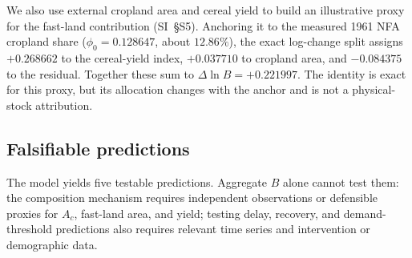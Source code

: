 \documentclass[preprint,12pt,authoryear]{elsarticle}
\begin{document}
We also use external cropland area and cereal yield to build an illustrative proxy for the fast-land contribution (SI~\S S5). Anchoring it to the measured 1961 NFA cropland share ($\phi_0=0.128647$, about $12.86\%$), the exact log-change split assigns $+0.268662$ to the cereal-yield index, $+0.037710$ to cropland area, and $-0.084375$ to the residual. Together these sum to $\Delta\ln B=+0.221997$. The identity is exact for this proxy, but its allocation changes with the anchor and is not a physical-stock attribution.

\subsection{Falsifiable predictions}\label{sec:predictions}

The model yields five testable predictions. Aggregate $B$ alone cannot test them: the composition mechanism requires independent observations or defensible proxies for $A_c$, fast-land area, and yield; testing delay, recovery, and demand-threshold predictions also requires relevant time series and intervention or demographic data.
\end{document}
